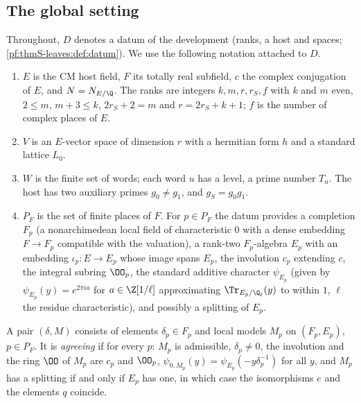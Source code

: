 \subsection{The global setting}\label{pf:thmS-leaves:ss:global}

Throughout, $D$ denotes a datum of the development (ranks, a host and spaces; \cref{pf:thmS-leaves:def:datum}). We
use the following notation attached to $D$.

\begin{definition}\label{pf:thmS-leaves:def:datum}
\begin{enumerate}
\item $E$ is the CM host field, $F$ its totally real subfield, $c$ the complex conjugation of $E$, and $N=N_{E/\Q}$.
The ranks are integers $k,m,r,r_S,f$ with $k$ and $m$ even, $2\le m$, $m+3\le k$, $2r_S+2=m$ and $r=2r_S+k+1$; $f$ is the
number of complex places of $E$.
\item $V$ is an $E$-vector space of dimension $r$ with a hermitian form $h$ and a standard lattice $L_0$.
\item $W$ is the finite set of words; each word $u$ has a level, a prime number $T_u$. The host has two auxiliary
primes $g_0\ne g_1$, and $g_S=g_0g_1$.
\item $P_F$ is the set of finite places of $F$. For $p\in P_F$ the datum provides a completion $F_p$ (a nonarchimedean
local field of characteristic $0$ with a dense embedding $F\to F_p$ compatible with the valuation), a rank-two
$F_p$-algebra $E_p$ with an embedding $\iota_p:E\to E_p$ whose image spans $E_p$, the involution $c_p$ extending $c$,
the integral subring $\OO_p$, the standard additive character $\psi_{E_p}$ (given by $\psi_{E_p}(y)=e^{2\pi ia}$ for
$a\in\Z[1/\ell]$ approximating $\Tr_{E_p/\Q_\ell}(y)$ to within $1$, $\ell$ the residue characteristic), and possibly a
splitting of $E_p$.
\end{enumerate}
\end{definition}

\begin{definition}\label{pf:thmS-leaves:def:agree}
A pair $(\delta,M)$ consists of elements $\delta_p\in F_p$ and local models $M_p$ on $(F_p,E_p)$, $p\in P_F$. It is
\emph{agreeing} if for every $p$: $M_p$ is admissible, $\delta_p\ne0$, the involution and the ring $\OO$ of $M_p$ are $c_p$
and $\OO_p$, $\psi_{0,M_p}(y)=\psi_{E_p}(-y\delta_p^{-1})$ for all $y$, and $M_p$ has a splitting if and only if $E_p$ has
one, in which case the isomorphisms $e$ and the elements $q$ coincide.
\end{definition}

